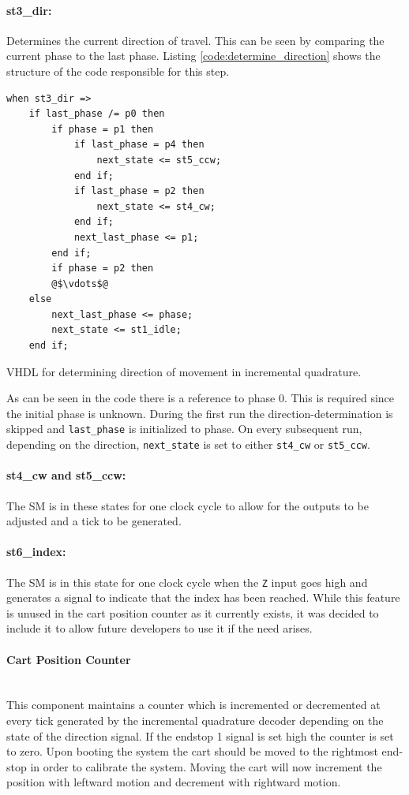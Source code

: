 \paragraph{st3\_dir:} %
Determines the current direction of travel.
This can be seen by comparing the current phase to the last phase.
Listing \ref{code:determine_direction} shows the structure of the code responsible for this step.
\begin{listing}[H]
\begin{verbatim}
when st3_dir =>
	if last_phase /= p0 then
	    if phase = p1 then
	        if last_phase = p4 then
	            next_state <= st5_ccw;
	        end if;
	        if last_phase = p2 then
	            next_state <= st4_cw;
	        end if;
	        next_last_phase <= p1;
	    end if;
	    if phase = p2 then
	    @$\vdots$@
    else
        next_last_phase <= phase;
        next_state <= st1_idle;
    end if;
\end{verbatim}
\caption{VHDL for determining direction of movement in incremental quadrature.}
\label{code:determine_direction}
\end{listing}
As can be seen in the code there is a reference to phase 0.
This is required since the initial phase is unknown.
During the first run the direction-determination is skipped and \texttt{last\_phase} is initialized to phase.
On every subsequent run, depending on the direction, \texttt{next\_state} is set to either \texttt{st4\_cw} or \texttt{st5\_ccw}.
\paragraph{st4\_cw and st5\_ccw:} %
The SM is in these states for one clock cycle to allow for the outputs to be adjusted and a tick to be generated.
\paragraph{st6\_index:} %
The SM is in this state for one clock cycle when the \texttt{Z} input goes high and generates a signal to indicate that the index has been reached.
While this feature is unused in the cart position counter as it currently exists, it was decided to include it to allow future developers to use it if the need arises.

\paragraph{Cart Position Counter}~\\ %
\label{par:cart_position_counter}
This component maintains a counter which is incremented or decremented at every tick generated by the incremental quadrature decoder depending on the state of the direction signal.
If the endstop 1 signal is set high the counter is set to zero.
Upon booting the system the cart should be moved to the rightmost end-stop in order to calibrate the system.
Moving the cart will now increment the position with leftward motion and decrement with rightward motion.

